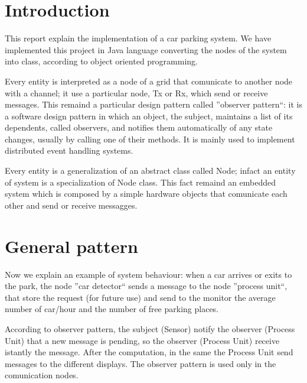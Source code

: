 \documentclass[a4paper,titlepage]{article}
\begin{document}
\begin{frontespizio}


\end{frontespizio}

\tableofcontents

\newpage

\part{Introduction}

This report explain the implementation of a car parking system. We have implemented this project in Java language converting the nodes of the system into class, according to object oriented programming.

Every entity is interpreted as a node of a grid that comunicate to another node with a channel; it use a particular node, Tx or Rx, which send or receive messages. This remaind a particular design pattern called ''observer pattern``: it is a software design pattern in which an object, the subject, maintains a list of its dependents, called observers, and notifies them automatically of any state changes, usually by calling one of their methods. It is mainly used to implement distributed event handling systems.

Every entity is a generalization of an abstract class called Node; infact an entity of system is a specialization of Node class. This fact remaind an embedded system which is composed by a simple hardware objects that comunicate each other and send or receive messagges.

\newpage
\part{General pattern}

Now we explain an example of system behaviour: when a car arrives or exits to the park, the node ''car detector`` sends a message to the node ''process unit``, that store the request (for future use) and send to the monitor the average number of car/hour and the number of free parking places.

According to observer pattern, the subject (Sensor) notify the observer (Process Unit) that a new message is pending, so the observer (Process Unit) receive istantly the message. After the computation, in the same the Process Unit send messages to the different displays.
The observer pattern is used only in the comunication nodes.
\end{document}
